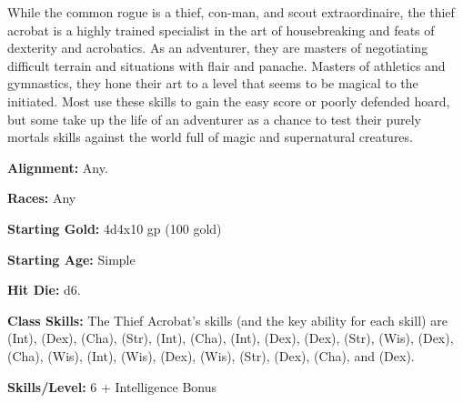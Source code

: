 
While the common rogue is a thief, con-man, and scout extraordinaire, the thief acrobat is a highly trained specialist in the art of housebreaking and feats of dexterity and acrobatics. As an adventurer, they are masters of negotiating difficult terrain and situations with flair and panache. Masters of athletics and gymnastics, they hone their art to a level that seems to be magical to the initiated. Most use these skills to gain the easy score or poorly defended hoard, but some take up the life of an adventurer as a chance to test their purely mortals skills against the world full of magic and supernatural creatures.

\textbf{Alignment:} Any.

\textbf{Races:} Any

\textbf{Starting Gold:} 4d4x10 gp (100 gold)

\textbf{Starting Age:} Simple

\textbf{Hit Die:} d6.

\textbf{Class Skills:} The Thief Acrobat's skills (and the key ability for each skill) are  (Int),  (Dex),  (Cha),  (Str),  (Int),  (Cha),  (Int),  (Dex),  (Dex),  (Str),  (Wis),  (Dex),  (Cha),  (Wis),  (Int),  (Wis),  (Dex),  (Wis),  (Str),  (Dex),  (Cha), and  (Dex).

\textbf{Skills/Level:} 6 + Intelligence Bonus

\modebab{}
\poorfor{}
\goodref{}
\poorwil{}

\begin{classtable}
\end{classtable}

